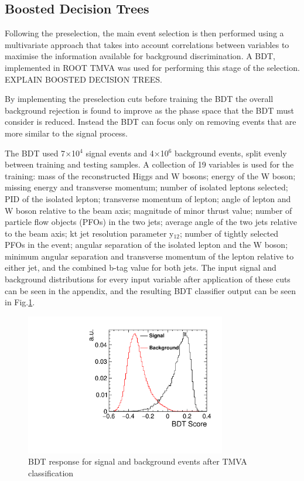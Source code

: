\subsection{Boosted Decision Trees}

Following the preselection, the main event selection is then performed using a multivariate approach that takes into account correlations between variables to maximise the information available for background discrimination. A \ac{BDT}, implemented in ROOT TMVA \cite{2007physics...3039H} was used for performing this stage of the selection. EXPLAIN BOOSTED DECISION TREES.

By implementing the preselection cuts before training the \ac{BDT} the overall background rejection is found to improve as the phase space that the \ac{BDT} must consider is reduced. Instead the \ac{BDT} can focus only on removing events that are more similar to the signal process. 

The BDT used 7$\times$10$^4$ signal events and 4$\times$10$^6$ background events, split evenly between training and testing samples. A collection of 19 variables is used for the training: mass of the reconstructed Higgs and W bosons; energy of the W boson; missing energy and transverse momentum; number of isolated leptons selected; PID of the isolated lepton; transverse momentum of lepton; angle of lepton and W boson relative to the beam axis; magnitude of minor thrust value; number of particle flow objects (PFOs) in the two jets; average angle of the two jets relative to the beam axis; kt jet resolution parameter y$_{12}$; number of tightly selected PFOs in the event; angular separation of the isolated lepton and the W boson;  minimum angular separation and transverse momentum of the lepton relative to either jet, and the combined b-tag value for both jets. The input signal and background distributions for every input variable after application of these cuts can be seen in the appendix, and the resulting BDT classifier output can be seen in Fig.\ref{bdt}.  

\begin{figure}
  \centering
  \includegraphics[width=0.78\textwidth,keepaspectratio]{HiggsAnalysis/figures/bdtscore}
  \caption[Classifier BDT response]{BDT response for signal and background events after TMVA classification}
  \label{bdt}
\end{figure}

